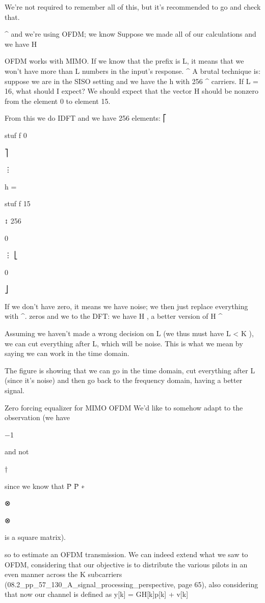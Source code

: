 {{{We're not required to remember all of this, but it's recommended to go and check that.

^ and we're using OFDM; we know Suppose we made all of our calculations and we have H

OFDM works with MIMO. If we know that the prefix is L, it means that we won't have more than L numbers in the input's response.
^
A brutal technique is: suppose we are in the SISO setting and we have the h with 256
^
carriers. If L = 16, what should I expect? We should expect that the vector H should be nonzero from the element 0 to element 15.

From this we do IDFT and we have 256 elements:
⎡

stuf f 0

⎤

⋮

h =

stuf f 15

↕ 256

0

⋮
⎣

0

⎦

If we don't have zero, it means we have noise; we then just replace everything with
^.
zeros and we to the DFT: we have H , a better version of H
^\star

Assuming we haven't made a wrong decision on L (we thus must have L < K ), we can cut everything after L, which will be noise.
This is what we mean by saying we can work in the time domain.

The figure is showing that we can go in the time domain, cut everything after L (since it's noise) and then go back to the frequency domain, having a better signal.

Zero forcing equalizer for MIMO OFDM We'd like to somehow adapt to the observation (we have

−1

and not

†

since we know that P̄ P̄
∗

⊗

⊗

is a square matrix).

so to estimate an OFDM transmission.
We can indeed extend what we saw to OFDM, considering that our objective is to distribute the various pilots in an even manner across the K subcarriers
(08.2_pp_57_130_A_signal_processing_perspective, page 65), also considering that now our channel is defined as y[k] = \sqrt GH[k]p[k] + v[k]

}}}
